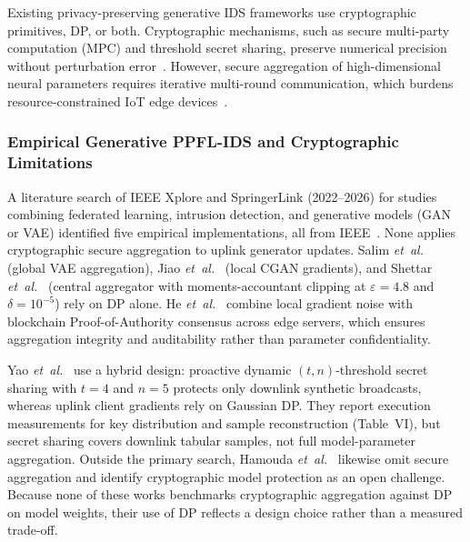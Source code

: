 Existing privacy-preserving generative IDS frameworks use cryptographic primitives, DP, or both. Cryptographic mechanisms, such as secure multi-party computation (MPC) and threshold secret sharing, preserve numerical precision without perturbation error~\cite{cunhaneto2023}. However, secure aggregation of high-dimensional neural parameters requires iterative multi-round communication, which burdens resource-constrained IoT edge devices~\cite{cunhaneto2023}.

\subsubsection*{Empirical Generative PPFL-IDS and Cryptographic Limitations}
A literature search of IEEE Xplore and SpringerLink (2022--2026) for studies combining federated learning, intrusion detection, and generative models (GAN or VAE) identified five empirical implementations, all from IEEE~\cite{yao2024, he2023, salim2025, jiao2025, shettar2026}. None applies cryptographic secure aggregation to uplink generator updates. Salim \textit{et~al.}~\cite{salim2025} (global VAE aggregation), Jiao \textit{et~al.}~\cite{jiao2025} (local CGAN gradients), and Shettar \textit{et~al.}~\cite{shettar2026} (central aggregator with moments-accountant clipping at $\varepsilon = 4.8$ and $\delta = 10^{-5}$) rely on DP alone. He \textit{et~al.}~\cite{he2023} combine local gradient noise with blockchain Proof-of-Authority consensus across edge servers, which ensures aggregation integrity and auditability rather than parameter confidentiality.

Yao \textit{et~al.}~\cite{yao2024} use a hybrid design: proactive dynamic $(t, n)$-threshold secret sharing with $t=4$ and $n=5$ protects only downlink synthetic broadcasts, whereas uplink client gradients rely on Gaussian DP. They report execution measurements for key distribution and sample reconstruction (Table~VI), but secret sharing covers downlink tabular samples, not full model-parameter aggregation. Outside the primary search, Hamouda \textit{et~al.}~\cite{hamouda2024} likewise omit secure aggregation and identify cryptographic model protection as an open challenge. Because none of these works benchmarks cryptographic aggregation against DP on model weights, their use of DP reflects a design choice rather than a measured trade-off.

